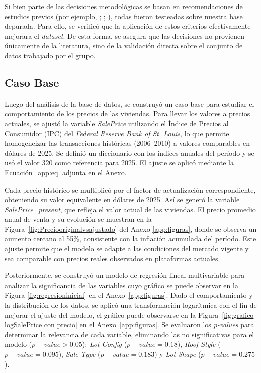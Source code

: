 
Si bien parte de las decisiones metodológicas se basan en recomendaciones de estudios previos (por ejemplo, ; ; ), todas fueron testeadas sobre nuestra base depurada. Para ello, se verificó que la aplicación de estos criterios efectivamente mejorara el \textit{dataset}. De esta forma, se asegura que las decisiones no provienen únicamente de la literatura, sino de la validación directa sobre el conjunto de datos trabajado por el grupo. %


\subsection{Caso Base \label{sec:sub3}}

Luego del análisis de la base de datos, se construyó un caso base para estudiar el comportamiento de los precios de las viviendas. Para llevar los valores a precios actuales, se ajustó la variable \textit{SalePrice} utilizando el Índice de Precios al Consumidor (IPC) del \textit{Federal Reserve Bank of St. Louis}, lo que permite homogeneizar las transacciones históricas (2006–2010) a valores comparables en dólares de 2025. Se definió un diccionario con los índices anuales del período y se usó el valor 320 como referencia para 2025. El ajuste se aplicó mediante la Ecuación~\ref{app:eq} adjunta en el Anexo.

Cada precio histórico se multiplicó por el factor de actualización correspondiente, obteniendo su valor equivalente en dólares de 2025. Así se generó la variable \textit{SalePrice\_present}, que refleja el valor actual de las viviendas. El precio promedio anual de venta y su evolución se muestran en la Figura~\ref{fig:Preciooriginalvsajustado} del Anexo \ref{app:figuras}, donde se observa un aumento cercano al 55\%, consistente con la inflación acumulada del período. Este ajuste permite que el modelo se adapte a las condiciones del mercado vigente y sea comparable con precios reales observados en plataformas actuales.

Posteriormente, se construyó un modelo de regresión lineal multivariable para analizar la significancia de las variables cuyo gráfico se puede observar en la Figura \ref{fig:regresioninicial} en el Anexo~\ref{app:figuras}. Dado el comportamiento y la distribución de los datos, se aplicó una transformación logarítmica con el fin de mejorar el ajuste del modelo, el gráfico puede observarse en la Figura~\ref{fig:grafico logSalePrice con precio} en el Anexo~\ref{app:figuras}. Se evaluaron los \textit{p-values} para determinar la relevancia de cada variable, eliminando las no significativas para el modelo (\(p-value>0.05\)): \textit{Lot Config} (\(p-value=0.18\)), \textit{Roof Style} (\(p-value=0.095\)), \textit{Sale Type} (\(p-value=0.183\)) y \textit{Lot Shape} (\(p-value=0.275\)). 

